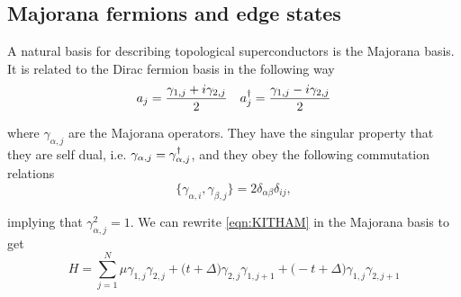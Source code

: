 \subsection{Majorana fermions and edge states}

A natural basis for describing topological superconductors is the Majorana basis. It is related to the Dirac fermion basis in the following way
\begin{align}
    &a_{j} = \frac{\gamma_{1,j} + i\gamma_{2,j}}{2} &a_{j}^{\dagger} = \frac{\gamma_{1,j} - i\gamma_{2,j}}{2}
\end{align}

\noi where $\gamma_{\alpha,j}$ are the Majorana operators. They have the singular property that they are self dual, i.e. $\gamma_{\alpha,j}=\gamma_{\alpha,j}^{\dagger}$, and they obey the following commutation relations
\begin{equation}
    \big\{\gamma_{\alpha,i},\gamma_{\beta,j}\big\}=2\delta_{\alpha\beta}\delta_{ij},
\end{equation}

\noi implying that $\gamma_{\alpha,j}^{2}=1$. We can rewrite \eqref{eqn:KITHAM} in the Majorana basis to get
\begin{equation}
    H = \sum_{j=1}^{N} \mu \gamma_{1,j}\gamma_{2,j} + \big(t + \Delta\big)\gamma_{2,j}\gamma_{1,j+1} + \big(-t+\Delta\big)\gamma_{1,j}\gamma_{2,j+1}
\end{equation}
